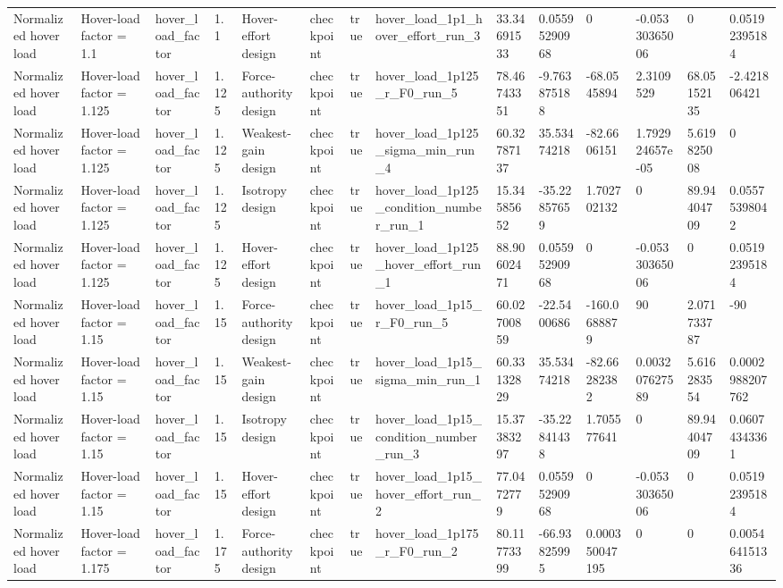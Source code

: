 \begin{tabular}{@{}llllllllllllll@{}}
Normalized hover load & Hover-load factor = 1.1 & hover\_load\_factor & 1.1 & Hover-effort design & checkpoint & true & hover\_load\_1p1\_hover\_effort\_run\_3 & 33.34691533 & 0.05595290968 & 0 & -0.05330365006 & 0 & 0.05192395184 \\
Normalized hover load & Hover-load factor = 1.125 & hover\_load\_factor & 1.125 & Force-authority design & checkpoint & true & hover\_load\_1p125\_r\_F0\_run\_5 & 78.46743351 & -9.763875188 & -68.0545894 & 2.3109529 & 68.05152135 & -2.421806421 \\
Normalized hover load & Hover-load factor = 1.125 & hover\_load\_factor & 1.125 & Weakest-gain design & checkpoint & true & hover\_load\_1p125\_sigma\_min\_run\_4 & 60.32787137 & 35.53474218 & -82.6606151 & 1.792924657e-05 & 5.619825008 & 0 \\
Normalized hover load & Hover-load factor = 1.125 & hover\_load\_factor & 1.125 & Isotropy design & checkpoint & true & hover\_load\_1p125\_condition\_number\_run\_1 & 15.34585652 & -35.22857659 & 1.702702132 & 0 & 89.94404709 & 0.05575398042 \\
Normalized hover load & Hover-load factor = 1.125 & hover\_load\_factor & 1.125 & Hover-effort design & checkpoint & true & hover\_load\_1p125\_hover\_effort\_run\_1 & 88.90602471 & 0.05595290968 & 0 & -0.05330365006 & 0 & 0.05192395184 \\
Normalized hover load & Hover-load factor = 1.15 & hover\_load\_factor & 1.15 & Force-authority design & checkpoint & true & hover\_load\_1p15\_r\_F0\_run\_5 & 60.02700859 & -22.5400686 & -160.0688879 & 90 & 2.071733787 & -90 \\
Normalized hover load & Hover-load factor = 1.15 & hover\_load\_factor & 1.15 & Weakest-gain design & checkpoint & true & hover\_load\_1p15\_sigma\_min\_run\_1 & 60.33132829 & 35.53474218 & -82.66282382 & 0.003207627589 & 5.616283554 & 0.0002988207762 \\
Normalized hover load & Hover-load factor = 1.15 & hover\_load\_factor & 1.15 & Isotropy design & checkpoint & true & hover\_load\_1p15\_condition\_number\_run\_3 & 15.37383297 & -35.22841438 & 1.705577641 & 0 & 89.94404709 & 0.06074343361 \\
Normalized hover load & Hover-load factor = 1.15 & hover\_load\_factor & 1.15 & Hover-effort design & checkpoint & true & hover\_load\_1p15\_hover\_effort\_run\_2 & 77.0472779 & 0.05595290968 & 0 & -0.05330365006 & 0 & 0.05192395184 \\
Normalized hover load & Hover-load factor = 1.175 & hover\_load\_factor & 1.175 & Force-authority design & checkpoint & true & hover\_load\_1p175\_r\_F0\_run\_2 & 80.11773399 & -66.93825995 & 0.000350047195 & 0 & 0 & 0.005464151336 \\

\end{tabular}
